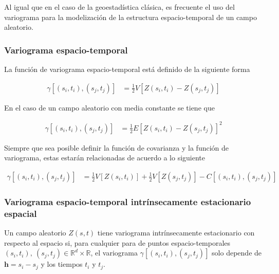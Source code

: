 \documentclass[
]{book}
\begin{document}
Al igual que en el caso de la geoestadística clásica, es frecuente el uso del variograma para la modelización de la estructura espacio-temporal de un campo aleatorio.

\hypertarget{variograma-espacio-temporal}{%
\subsubsection*{Variograma espacio-temporal}\label{variograma-espacio-temporal}}

La función de variograma espacio-temporal está definido de la siguiente forma

\begin{align}
\gamma[(s_i,t_i),(s_j,t_j)]&=\frac{1}{2}V[Z(s_i,t_i)-Z(s_j,t_j)]
\end{align}

En el caso de un campo aleatorio con media constante se tiene que

\begin{align}
\gamma[(s_i,t_i),(s_j,t_j)]&=\frac{1}{2}E[Z(s_i,t_i)-Z(s_j,t_j)]^2
\end{align}

Siempre que sea posible definir la función de covarianza y la función de variograma, estas estarán relacionadas de acuerdo a lo siguiente

\begin{align}
\gamma[(s_i,t_i),(s_j,t_j)]&=\frac{1}{2}V[Z(s_i,t_i)]+\frac{1}{2}V[Z(s_j,t_j)]-C[(s_i,t_i),(s_j,t_j)]
\label{eq:varivar}
\end{align}

\hypertarget{variograma-espacio-temporal-intruxednsecamente-estacionario-espacial}{%
\subsubsection*{Variograma espacio-temporal intrínsecamente estacionario espacial}\label{variograma-espacio-temporal-intruxednsecamente-estacionario-espacial}}

Un campo aleatorio \(Z(s,t)\) tiene variograma intrínsecamente estacionario con respecto al espacio si, para cualquier para de puntos espacio-temporales \((s_i,t_i), \ (s_j,t_j) \in \mathbb{R}^d \times \mathbb{R}\), el variograma \(\gamma[(s_i,t_i),(s_j,t_j)]\) solo depende de \(\textbf{h}=s_i-s_j\) y los tiempos \(t_i\) y \(t_j\).
\end{document}
